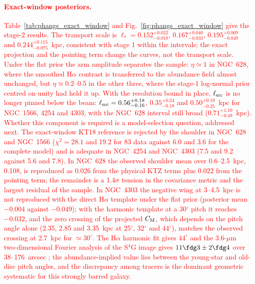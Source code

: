 \documentclass[fleqn,usenatbib]{mnras}
\newcommand{\revadd}[1]{\textcolor{red}{#1}}
\begin{document}
\revadd{\paragraph*{Exact-window posteriors.}  Table~\ref{tab:phangs_exact_window} and Fig.~\ref{fig:phangs_exact_window} give the stage-2 results.  The transport scale is $\ell_\ast=0.152^{+0.022}_{-0.018}$, $0.167^{+0.040}_{-0.033}$, $0.195^{+0.069}_{-0.049}$ and $0.244^{+0.115}_{-0.075}$~kpc, consistent with stage 1 within the intervals; the exact projection and the pointing term change the curves, not the transport scale.  Under the flat prior the arm amplitude separates the sample: $\eta\simeq1$ in NGC~628, where the smoothed H$\alpha$ contrast is transferred to the abundance field almost unchanged, but $\eta\simeq0.2$--0.5 in the other three, where the stage-1 log-normal prior centred on unity had held it up.  With the resolution bound in place, $\ell_{\rm src}$ is no longer pinned below the beam: $\ell_{\rm src}=0.56^{+0.18}_{-0.16}$, $0.35^{+0.24}_{-0.18}$ and $0.50^{+0.19}_{-0.25}$~kpc for NGC~1566, 4254 and 4303, with the NGC~628 interval still broad ($0.71^{+1.10}_{-0.49}$~kpc).  Whether this component is required is a model-selection question, addressed next.  The exact-window KT18 reference is rejected by the shoulder in NGC~628 and NGC~1566 ($\chi^2=28.1$ and 19.2 for 83 data against 6.0 and 3.6 for the complete model) and is adequate in NGC~4254 and NGC~4303 (7.5 and 9.2 against 5.6 and 7.8).  In NGC~628 the observed shoulder mean over 0.6--2.5~kpc, 0.108, is reproduced as 0.026 from the physical KTZ terms plus 0.022 from the pointing term; the remainder is a 1.4$\sigma$ tension in the covariance metric and the largest residual of the sample.  In NGC~4303 the negative wing at 3--4.5~kpc is not reproduced with the direct H$\alpha$ template under the flat prior (posterior mean $-0.004$ against $-0.049$); with the harmonic template at a 30$^\circ$ pitch it reaches $-0.032$, and the zero crossing of the projected $C_{\rm M}$, which depends on the pitch angle alone (2.35, 2.85 and 3.35~kpc at 25$^\circ$, 32$^\circ$ and 44$^\circ$), matches the observed crossing at 2.7~kpc for $\simeq30^\circ$.  The H$\alpha$ harmonic fit gives $44^\circ$ and the 3.6-$\mu$m two-dimensional Fourier analysis of the S$^4$G image gives $11\fdg3\pm2\fdg4$ over 38--176~arcsec \citep{DiazGarcia2019}; the abundance-implied value lies between the young-star and old-disc pitch angles, and the discrepancy among tracers is the dominant geometric systematic for this strongly barred galaxy.}
\end{document}
